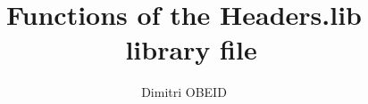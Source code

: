 \documentclass[a4paper,10pt]{article}
\title{\color{sec1}Functions of the \color{path}Headers.lib\color{sec1} \ library file}\color{text}
\author{Dimitri OBEID}
\begin{document}
    \maketitle
    \newpage

    \hypertarget{contents}{}
    \tableofcontents
    \newpage

    \color{sec1}
    \section{}\color{text}
\end{document}
